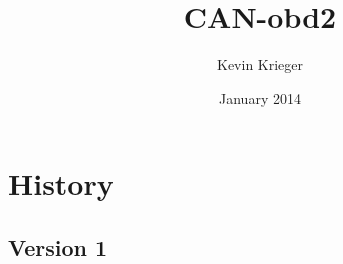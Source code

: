 \documentclass{article}
\title{CAN-obd2}
\author{Kevin Krieger}
\date{January 2014}
\begin{document}
\maketitle
\tableofcontents
\newpage

\section{History} \label{history}

\subsection{Version 1}

\section{} \label{}

\section{} \label{}

\section{} \label{}

\section{} \label{}

\section{} \label{}

\section{} \label{}




\appendix
\end{document}
